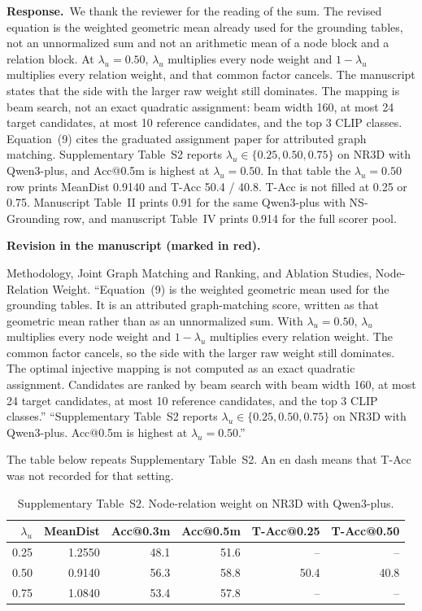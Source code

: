 \documentclass[11pt]{article}
\newcommand{\revresponse}[1]{%
  \par\noindent\textbf{Response.}\ #1\par\vspace{0.3em}}
\newcommand{\revchange}[1]{%
  \par\noindent\textbf{Revision in the manuscript (marked in red).}\par
  \noindent\textcolor{revred}{#1}\par\vspace{0.8em}}
\begin{document}
\revresponse{We thank the reviewer for the reading of the sum. The revised equation is the weighted geometric mean already used for the grounding tables, not an unnormalized sum and not an arithmetic mean of a node block and a relation block. At \(\lambda_u=0.50\), \(\lambda_u\) multiplies every node weight and \(1-\lambda_u\) multiplies every relation weight, and that common factor cancels. The manuscript states that the side with the larger raw weight still dominates. The mapping is beam search, not an exact quadratic assignment: beam width 160, at most 24 target candidates, at most 10 reference candidates, and the top 3 CLIP classes. Equation~(9) cites the graduated assignment paper for attributed graph matching. Supplementary Table~S2 reports \(\lambda_u\in\{0.25,0.50,0.75\}\) on NR3D with Qwen3-plus, and Acc@0.5m is highest at \(\lambda_u=0.50\). In that table the \(\lambda_u=0.50\) row prints MeanDist 0.9140 and T-Acc 50.4 / 40.8. T-Acc is not filled at 0.25 or 0.75. Manuscript Table~II prints 0.91 for the same Qwen3-plus with NS-Grounding row, and manuscript Table~IV prints 0.914 for the full scorer pool.}

\revchange{Methodology, Joint Graph Matching and Ranking, and Ablation Studies, Node-Relation Weight. ``Equation~(9) is the weighted geometric mean used for the grounding tables. It is an attributed graph-matching score, written as that geometric mean rather than as an unnormalized sum. With \(\lambda_u=0.50\), \(\lambda_u\) multiplies every node weight and \(1-\lambda_u\) multiplies every relation weight. The common factor cancels, so the side with the larger raw weight still dominates. The optimal injective mapping is not computed as an exact quadratic assignment. Candidates are ranked by beam search with beam width 160, at most 24 target candidates, at most 10 reference candidates, and the top 3 CLIP classes.'' ``Supplementary Table~S2 reports \(\lambda_u\in\{0.25,0.50,0.75\}\) on NR3D with Qwen3-plus. Acc@0.5m is highest at \(\lambda_u=0.50\).''}

\noindent The table below repeats Supplementary Table~S2. An en dash means that T-Acc was not recorded for that setting.

\begin{table}[ht]
\centering
\caption{Supplementary Table~S2. Node-relation weight on NR3D with Qwen3-plus.}
\label{tab:lambda}
\small
\begin{tabular}{rrrrrr}
\toprule
\(\lambda_u\) & MeanDist & Acc@0.3m & Acc@0.5m & T-Acc@0.25 & T-Acc@0.50 \\
\midrule
0.25 & 1.2550 & 48.1 & 51.6 & -- & -- \\
0.50 & 0.9140 & 56.3 & 58.8 & 50.4 & 40.8 \\
0.75 & 1.0840 & 53.4 & 57.8 & -- & -- \\
\bottomrule
\end{tabular}
\end{table}
\end{document}
